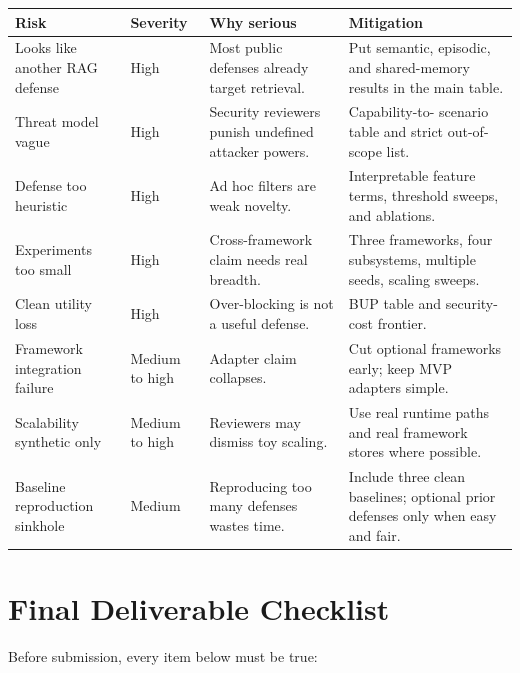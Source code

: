 \documentclass[11pt,oneside]{report}
\begin{document}
\begin{longtable}{|L{0.25\textwidth}|L{0.12\textwidth}|L{0.28\textwidth}|L{0.25\textwidth}|}
\hline
\textbf{Risk} & \textbf{Severity} & \textbf{Why serious} & \textbf{Mitigation} \\
\hline
Looks like another RAG defense & High & Most public defenses already target retrieval. & Put
semantic, episodic, and shared-memory results in the main table. \\
\hline
Threat model vague & High & Security reviewers punish undefined attacker powers. & Capability-to-
scenario table and strict out-of-scope list. \\
\hline
Defense too heuristic & High & Ad hoc filters are weak novelty. & Interpretable feature terms,
threshold sweeps, and ablations. \\
\hline
Experiments too small & High & Cross-framework claim needs real breadth. & Three frameworks, four
subsystems, multiple seeds, scaling sweeps. \\
\hline
Clean utility loss & High & Over-blocking is not a useful defense. & BUP table and security-cost
frontier. \\
\hline
Framework integration failure & Medium to high & Adapter claim collapses. & Cut optional frameworks
early; keep MVP adapters simple. \\
\hline
Scalability synthetic only & Medium to high & Reviewers may dismiss toy scaling. & Use real runtime
paths and real framework stores where possible. \\
\hline
Baseline reproduction sinkhole & Medium & Reproducing too many defenses wastes time. & Include
three clean baselines; optional prior defenses only when easy and fair. \\
\hline
\end{longtable}

\section{Final Deliverable Checklist}

Before submission, every item below must be true:
\end{document}
